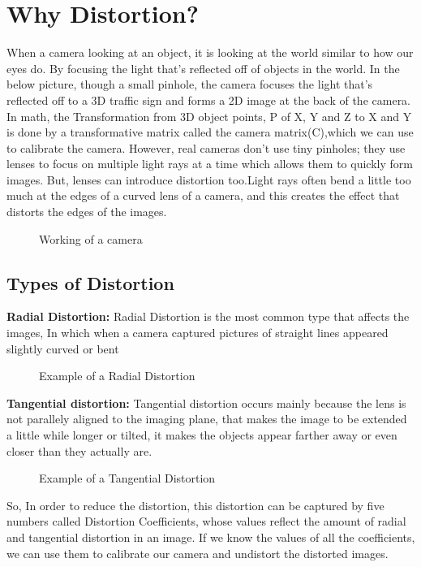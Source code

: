 \section{Why Distortion?}
When a camera looking at an object, it is looking at the world similar to how our eyes do. By focusing the light that’s reflected off of objects in the world. In the below picture, though a small pinhole, the camera focuses the light that’s reflected off to a 3D traffic sign and forms a 2D image at the back of the camera.
In math, the Transformation from 3D object points, P of X, Y and Z to X and Y is done by a transformative matrix called the camera matrix(C),which we can use to calibrate the camera. However, real cameras don’t use tiny pinholes; they use lenses to focus on multiple light rays at a time which allows them to quickly form images. But, lenses can introduce distortion too.Light rays often bend a little too much at the edges of a curved lens of a camera, and this creates the effect that distorts the edges of the images.
\begin{figure}[H]
	\centering
	\caption{Working of a camera \cite{Kummarikuntla:2019}} 
\end{figure}

\subsection{Types of Distortion} 
\textbf{Radial Distortion:} Radial Distortion is the most common type that affects the images, In which when a camera captured pictures of straight lines appeared slightly curved or bent

\begin{figure}[H]
	\centering
	\caption{Example of a Radial Distortion \cite{Kummarikuntla:2019}} 
\end{figure}

\textbf{Tangential distortion:} Tangential distortion occurs mainly because the lens is not parallely aligned to the imaging plane, that makes the image to be extended a little while longer or tilted, it makes the objects appear farther away or even closer than they actually are.

\begin{figure}[H]
	\centering
	\caption{Example of a Tangential Distortion \cite{Kummarikuntla:2019}} 
\end{figure}
So, In order to reduce the distortion, this distortion can be captured by five numbers called Distortion Coefficients, whose values reflect the amount of radial and tangential distortion in an image.
If we know the values of all the coefficients, we can use them to calibrate our camera and undistort the distorted images.

